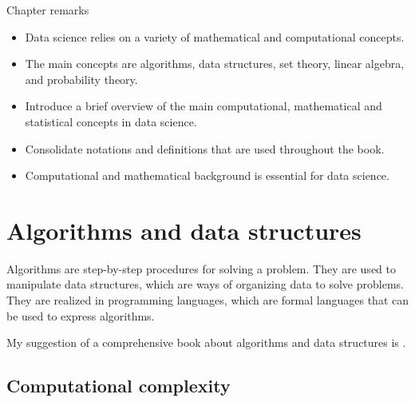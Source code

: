 \begin{mainbox}{Chapter remarks}


  \startcontents[chapters]
  \vspace{1em}


  \begin{itemize}
    \item Data science relies on a variety of mathematical and computational concepts.
    \item The main concepts are algorithms, data structures, set theory, linear algebra,
      and probability theory.
  \end{itemize}


  \begin{itemize}
    \item Introduce a brief overview of the main computational, mathematical and
      statistical concepts in data science.
    \item Consolidate notations and definitions that are used throughout the book.
  \end{itemize}


  \begin{itemize}
    \item Computational and mathematical background is essential for data science.
  \end{itemize}
\end{mainbox}

{}
\clearpage

\section{Algorithms and data structures}

Algorithms are step-by-step procedures for solving a problem.  They are used to
manipulate data structures, which are ways of organizing data to solve problems.
They are realized in programming languages, which are formal languages that can be used
to express algorithms.

My suggestion of a comprehensive book about algorithms and data structures is
\textcite{Cormen2022}.

\subsection{Computational complexity}

